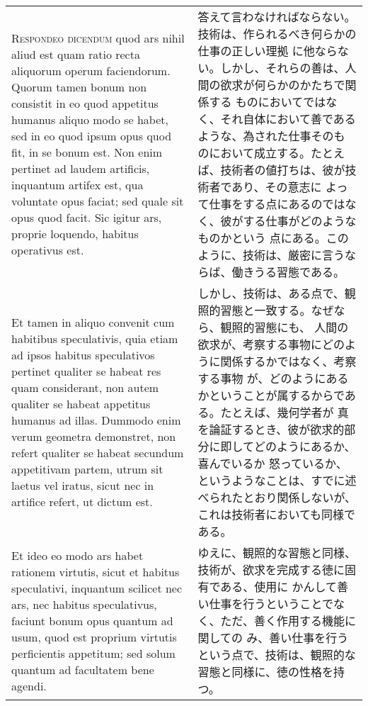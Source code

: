 \documentclass[10pt]{jsarticle} %
\begin{document}
\begin{longtable}{p{21em}p{21em}}
\\


{\scshape Respondeo dicendum} quod ars nihil aliud
 est quam ratio recta aliquorum operum faciendorum. Quorum tamen bonum
 non consistit in eo quod appetitus humanus aliquo modo se habet, sed in
 eo quod ipsum opus quod fit, in se bonum est. Non enim pertinet ad
 laudem artificis, inquantum artifex est, qua voluntate opus faciat; sed
 quale sit opus quod facit. Sic igitur ars, proprie loquendo, habitus
 operativus est. 


&

答えて言わなければならない。技術は、作られるべき何らかの仕事の正しい理拠
に他ならない。しかし、それらの善は、人間の欲求が何らかのかたちで関係する
ものにおいてではなく、それ自体において善であるような、為された仕事そのも
のにおいて成立する。たとえば、技術者の値打ちは、彼が技術者であり、その意志に
よって仕事をする点にあるのではなく、彼がする仕事がどのようなものかという
点にある。このように、技術は、厳密に言うならば、働きうる習態である。

\\


Et tamen in aliquo convenit cum habitibus speculativis,
 quia etiam ad ipsos habitus speculativos pertinet qualiter se habeat
 res quam considerant, non autem qualiter se habeat appetitus humanus ad
 illas. Dummodo enim verum geometra demonstret, non refert qualiter se
 habeat secundum appetitivam partem, utrum sit laetus vel iratus, sicut
 nec in artifice refert, ut dictum est. 


&

しかし、技術は、ある点で、観照的習態と一致する。なぜなら、観照的習態にも、
 人間の欲求が、考察する事物にどのように関係するかではなく、考察する事物
 が、どのようにあるかということが属するからである。たとえば、幾何学者が
 真を論証するとき、彼が欲求的部分に即してどのようにあるか、喜んでいるか
 怒っているか、というようなことは、すでに述べられたとおり関係しないが、
 これは技術者においても同様である。

\\


Et ideo eo modo ars habet
 rationem virtutis, sicut et habitus speculativi, inquantum scilicet nec
 ars, nec habitus speculativus, faciunt bonum opus quantum ad usum, quod
 est proprium virtutis perficientis appetitum; sed solum quantum ad
 facultatem bene agendi.

& 

ゆえに、観照的な習態と同様、技術が、欲求を完成する徳に固有である、使用に
かんして善い仕事を行うということでなく、ただ、善く作用する機能に関しての
み、善い仕事を行うという点で、技術は、観照的な習態と同様に、徳の性格を持
つ。



\end{longtable}
\end{document}
